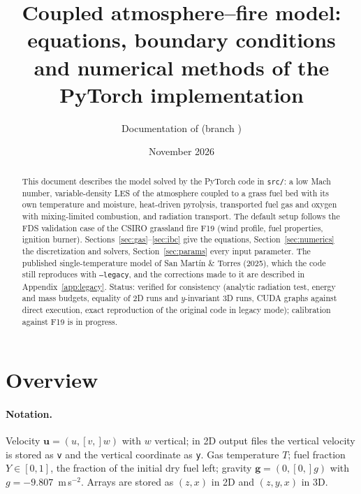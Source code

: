\documentclass[11pt,a4paper]{article}
\title{Coupled atmosphere--fire model: equations, boundary conditions\\and numerical methods of the PyTorch implementation}
\author{Documentation of \code{src/} (branch \code{density-transport})}
\date{November 2026}
\newcommand{\vu}{\mathbf{u}}
\newcommand{\code}[1]{\texttt{#1}}
\begin{document}
\maketitle

\begin{abstract}
This document describes the model solved by the PyTorch code in \code{src/}: a low Mach number,
variable-density LES of the atmosphere coupled to a grass fuel bed with its own temperature and
moisture, heat-driven pyrolysis, transported fuel gas and oxygen with mixing-limited combustion, and
radiation transport. The default setup follows the FDS validation case of the CSIRO grassland fire
F19 (wind profile, fuel properties, ignition burner). Sections~\ref{sec:gas}--\ref{sec:ibc} give the
equations, Section~\ref{sec:numerics} the discretization and solvers, Section~\ref{sec:params} every
input parameter. The published single-temperature model of San Mart\'in \& Torres (2025), which the
code still reproduces with \code{--legacy}, and the corrections made to it are described in
Appendix~\ref{app:legacy}. Status: verified for consistency (analytic radiation test, energy and
mass budgets, equality of 2D runs and $y$-invariant 3D runs, CUDA graphs against direct execution,
exact reproduction of the original code in legacy mode); calibration against F19 is in progress.
\end{abstract}

\tableofcontents

\section{Overview}

\paragraph{Notation.} Velocity $\vu = (u,[v,]w)$ with $w$ vertical; in 2D output files the
vertical velocity is stored as \code{v} and the vertical coordinate as \code{y}. Gas temperature
$T$; fuel fraction $Y\in[0,1]$, the fraction of the initial dry fuel left; gravity
$\mathbf{g}=(0,[0,]g)$ with $g=-9.807$~m\,s$^{-2}$. Arrays are stored as $(z,x)$ in 2D and
$(z,y,x)$ in 3D.
\end{document}

